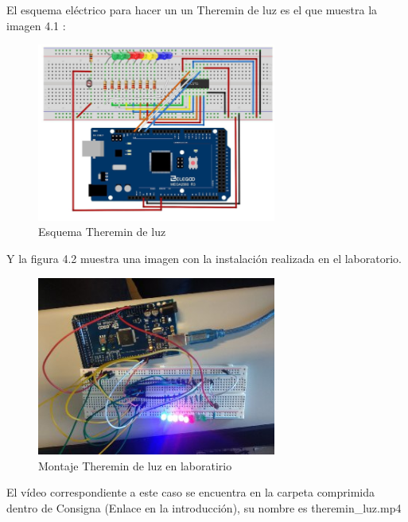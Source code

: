 	El esquema eléctrico para hacer un un Theremin de luz es el que muestra la imagen 4.1 :
	
	\begin{figure}[htb]
		\centering
		\includegraphics[width=0.7\textwidth]{./imagenes/4}
		\caption{Esquema Theremin de luz} \label{fig:1}
	\end{figure}
	
	Y la figura 4.2 muestra una imagen con la instalación realizada en el laboratorio. \\
	
	\begin{figure}[htb]
		\centering
		\includegraphics[width=0.7\textwidth]{./imagenes/5}
		\caption{Montaje Theremin de luz en laboratirio} \label{fig:1}
	\end{figure}
	
	El vídeo correspondiente a este caso se encuentra en la carpeta comprimida dentro de Consigna (Enlace en la introducción),
	su nombre es theremin\_luz.mp4
		

	


